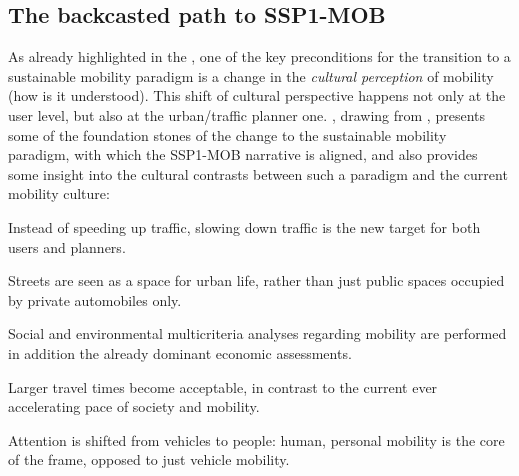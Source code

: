 \subsection{The backcasted path to SSP1-MOB}
\label{ss:results:backcasting-the-path}
As already highlighted in the , one of the key preconditions for the transition to a sustainable mobility paradigm is a change in the \emph{cultural perception} of mobility (how is it understood). This shift of cultural perspective happens not only at the user level, but also at the urban/traffic planner one. \textcite{banister2008_sustainablemobilityparadigm}, drawing from \textcite{marshall2001_challengesustainabletransport}, presents some of the foundation stones of the change to the sustainable mobility paradigm, with which the SSP1-MOB narrative is aligned, and also provides some insight into the cultural contrasts between such a paradigm and the current mobility culture:
%
\begin{enumeratealpha}
\item Instead of speeding up traffic, slowing down traffic is the new target for both users and planners.
\item Streets are seen as a space for urban life, rather than just public spaces occupied by private automobiles only.
\item Social and environmental multicriteria analyses regarding mobility are performed in addition the already dominant economic assessments.
\item Larger travel times become acceptable, in contrast to the current ever accelerating pace of society and mobility.
\item Attention is shifted from vehicles to people: human, personal mobility is the core of the frame, opposed to just vehicle mobility.
\end{enumeratealpha}


